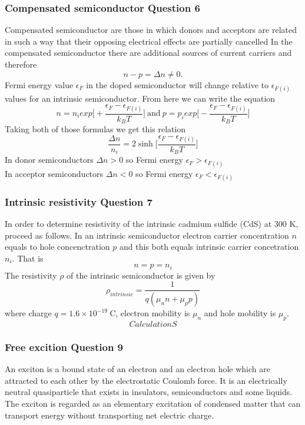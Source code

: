 \subsubsection*{Compensated semiconductor Question 6}

Compensated semiconductor are those in which donors and acceptors are related in such a way that their opposing electrical effects are partially cancelled
In the compensated semiconductor there are additional sources of current carriers and therefore
$$
n - p = \Delta n \neq 0.
$$
Fermi energy value $\epsilon_F$ in the doped semiconductor will change relative to $\epsilon_{F(i)}$ values for an intrinsic semiconductor. From here we can write the equation
$$
n = n_i exp\bigg[+\frac{\epsilon_F - \epsilon_{F(i)}}{k_B T}\bigg] \ \mathrm{and} \
p = p_i exp\bigg[-\frac{\epsilon_F - \epsilon_{F(i)}}{k_B T}\bigg]
$$
Taking both of those formulas we get this relation
\begin{equation}
\frac{\Delta n}{n_i} = 2\sinh{\bigg[\frac{\epsilon_F - \epsilon_{F(i)}}{k_B T}\bigg]}
\end{equation}
In donor semiconductors $\Delta n > 0$ so Fermi energy $\epsilon_F > \epsilon_{F(i)}$ \\
In acceptor semiconductors $\Delta n < 0$ so Fermi energy $\epsilon_F < \epsilon_{F(i)}$

\subsubsection*{Intrinsic resistivity Question 7}
In order to determine resistivity of the intrinsic cadmium sulfide (CdS) at 300 K, proceed as follows. In an intrinsic semiconductor electron carrier concentration $n$ equals to hole concenctration $p$ and this both equals intrinsic carrier concetration $n_i$. That is
$$
n = p = n_i 
$$
The resistivity $\rho$ of the intrinsic semiconductor is given by
$$
\rho_{intrinsic} = \frac{1}{q(\mu_nn + \mu_pp)}
$$
where charge $q = 1.6 \times 10^{-19}\ \mathrm{C}$, electron mobility is $\mu_n$ and hole mobility is $\mu_p$.
\begin{equation}
CalculationS
\end{equation}


\subsubsection*{Free excition Question 9}

An exciton is a bound state of an electron and an electron hole which are attracted to each other by the electrostatic Coulomb force. It is an electrically neutral quasiparticle that exists in insulators, semiconductors and some liquids. The exciton is regarded as an elementary excitation of condensed matter that can transport energy without transporting net electric charge.

